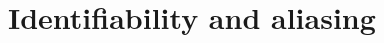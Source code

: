 \documentclass[aap,preprint]{imsart}
\newcommand{\reals}{{\mathbb R}}
\begin{document}




\section{Identifiability and aliasing}\label{sec:ident_aliasing}
\end{document}
